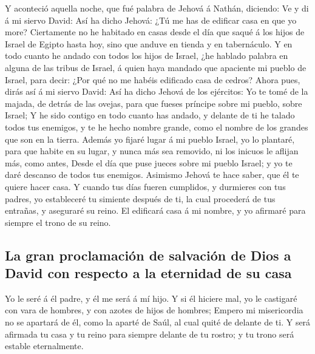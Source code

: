  Y aconteció aquella noche, que fué palabra de Jehová á
Nathán, diciendo:  Ve y di á mi siervo David: Así ha dicho
Jehová: ¿Tú me has de edificar casa en que yo more? 
Ciertamente no he habitado en casas desde el día que saqué á los hijos
de Israel de Egipto hasta hoy, sino que anduve en tienda y en
tabernáculo.  Y en todo cuanto he andado con todos los
hijos de Israel, ¿he hablado palabra en alguna de las tribus de Israel,
á quien haya mandado que apaciente mi pueblo de Israel, para decir: ¿Por
qué no me habéis edificado casa de cedros?  Ahora pues,
dirás así á mi siervo David: Así ha dicho Jehová de los ejércitos: Yo te
tomé de la majada, de detrás de las ovejas, para que fueses príncipe
sobre mi pueblo, sobre Israel;  Y he sido contigo en todo
cuanto has andado, y delante de ti he talado todos tus enemigos, y te he
hecho nombre grande, como el nombre de los grandes que son en la tierra.
 Además yo fijaré lugar á mi pueblo Israel, yo lo
plantaré, para que habite en su lugar, y nunca más sea removido, ni los
inicuos le aflijan más, como antes,  Desde el día que
puse jueces sobre mi pueblo Israel; y yo te daré descanso de todos tus
enemigos. Asimismo Jehová te hace saber, que él te quiere hacer casa.
 Y cuando tus días fueren cumplidos, y durmieres con tus
padres, yo estableceré tu simiente después de ti, la cual procederá de
tus entrañas, y aseguraré su reino.  El edificará casa á
mi nombre, y yo afirmaré para siempre el trono de su reino.

\hypertarget{la-gran-proclamaciuxf3n-de-salvaciuxf3n-de-dios-a-david-con-respecto-a-la-eternidad-de-su-casa}{%
\subsection{La gran proclamación de salvación de Dios a David con
respecto a la eternidad de su
casa}\label{la-gran-proclamaciuxf3n-de-salvaciuxf3n-de-dios-a-david-con-respecto-a-la-eternidad-de-su-casa}}

 Yo le seré á él padre, y él me será á mí hijo. Y si él
hiciere mal, yo le castigaré con vara de hombres, y con azotes de hijos
de hombres;  Empero mi misericordia no se apartará de él,
como la aparté de Saúl, al cual quité de delante de ti. 
Y será afirmada tu casa y tu reino para siempre delante de tu rostro; y
tu trono será estable eternalmente.

